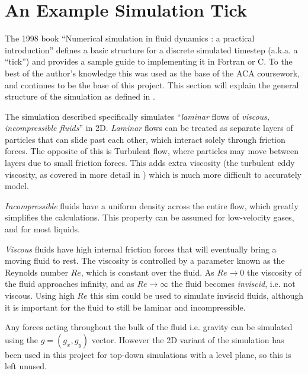 \newcommand{\deltaT}[0]{$\delta{}t$}
\newcommand{\deltaX}[0]{$\delta{}x$}
\newcommand{\deltaY}[0]{$\delta{}y$}

\section{An Example Simulation Tick}
The 1998 book ``Numerical simulation in fluid dynamics : a practical introduction''\cite{book:griebel1998numerical} defines a basic structure for a discrete simulated timestep (a.k.a. a ``tick'') and provides a sample guide to implementing it in Fortran or C.
To the best of the author's knowledge this was used as the base of the ACA coursework, and continues to be the base of this project.
This section will explain the general structure of the simulation as defined in \cite{book:griebel1998numerical}.

The simulation described specifically simulates ``\emph{laminar} flows of \emph{viscous, incompressible fluids}''\cite{book:griebel1998numerical} in 2D.
\emph{Laminar} flows can be treated as separate layers of particles that can slide past each other, which interact solely through friction forces.
The opposite of this is Turbulent flow, where particles may move between layers due to small friction forces\cite{book:griebel1998numerical}.
This adds extra viscosity (the turbulent eddy viscosity, as covered in more detail in \cite{bird2006transport}) which is much more difficult to accurately model.

\emph{Incompressible} fluids have a uniform density across the entire flow, which greatly simplifies the calculations.
This property can be assumed for low-velocity gases, and for most liquids\cite{book:griebel1998numerical}.

\emph{Viscous} fluids have high internal friction forces that will eventually bring a moving fluid to rest.
The viscosity is controlled by a parameter known as the Reynolds number $Re$\cite{falkovich2018fluid}, which is constant over the fluid.
As $Re \to 0$ the viscosity of the fluid approaches infinity, and as $Re \to \infty$ the fluid becomes \emph{inviscid}, i.e. not viscous.
Using high $Re$ this sim could be used to simulate inviscid fluids, although it is important for the fluid to still be laminar and incompressible.

Any forces acting throughout the bulk of the fluid i.e. gravity can be simulated using the $g = (g_x, g_y)$ vector.
However the 2D variant of the simulation has been used in this project for top-down simulations with a level plane, so this is left unused.

